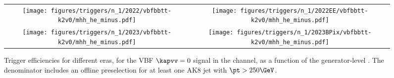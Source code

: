 
    \begin{figure}[H]
        \centering
        \begin{tabular}{cc}
            \texttt{[image: figures/triggers/n\_1/2022/vbfbbtt-k2v0/mhh\_he\_minus.pdf]} &
            \texttt{[image: figures/triggers/n\_1/2022EE/vbfbbtt-k2v0/mhh\_he\_minus.pdf]} \\[1ex]
            \texttt{[image: figures/triggers/n\_1/2023/vbfbbtt-k2v0/mhh\_he\_minus.pdf]} &
            \texttt{[image: figures/triggers/n\_1/2023BPix/vbfbbtt-k2v0/mhh\_he\_minus.pdf]}
            \label{fig}
        \end{tabular}
\caption{Trigger efficiencies for different eras, for the VBF \HHbbtt $\kapvv=0$ signal in the \tauhe channel, as a function of the generator-level \mHH. The denominator includes an offline preselection for at least one AK8 jet with $\pt > 250\GeV$.}
\label{fig:triggers_n-1_vbfbbtt-k2v0_he_mhh}
\end{figure}
